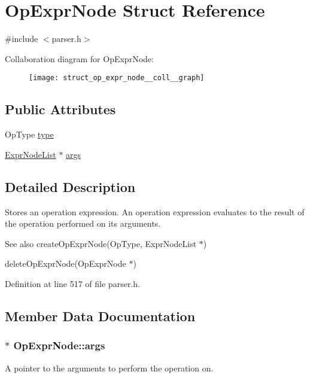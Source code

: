 \hypertarget{struct_op_expr_node}{\section{Op\-Expr\-Node Struct Reference}
\label{struct_op_expr_node}
}


{\ttfamily \#include $<$parser.\-h$>$}



Collaboration diagram for Op\-Expr\-Node\-:
\nopagebreak
\begin{figure}[H]
\begin{center}
\leavevmode
\texttt{[image: struct\_op\_expr\_node\_\_coll\_\_graph]}
\end{center}
\end{figure}
\subsection*{Public Attributes}
\begin{DoxyCompactItemize}
\item 
Op\-Type \hyperlink{struct_op_expr_node_a69ff4baea505db8ed32f4c4027f24ac6}{type}
\item 
\hyperlink{struct_expr_node_list}{Expr\-Node\-List} $\ast$ \hyperlink{struct_op_expr_node_a82d6f2c460a585ee3b0a46ce00ba186f}{args}
\end{DoxyCompactItemize}


\subsection{Detailed Description}
Stores an operation expression. An operation expression evaluates to the result of the operation performed on its arguments.

\begin{DoxySeeAlso}{See also}
create\-Op\-Expr\-Node(\-Op\-Type, Expr\-Node\-List $\ast$) 

delete\-Op\-Expr\-Node(\-Op\-Expr\-Node $\ast$) 
\end{DoxySeeAlso}


Definition at line 517 of file parser.\-h.



\subsection{Member Data Documentation}
\hypertarget{struct_op_expr_node_a82d6f2c460a585ee3b0a46ce00ba186f}{
\subsubsection[{args}]{$\ast$ {\bf Op\-Expr\-Node\-::args}}}\label{struct_op_expr_node_a82d6f2c460a585ee3b0a46ce00ba186f}
A pointer to the arguments to perform the operation on. 

